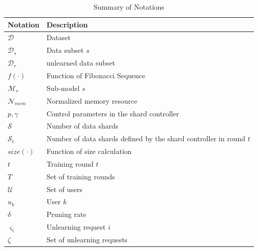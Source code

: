 \documentclass[conference,compsoc]{IEEEtran}
\begin{document}
\begin{table}[ht]
\vspace{-0.5 em}
\small
\renewcommand{\arraystretch}{1.}
\caption{{Summary of Notations}}

\label{tab:notations}
\centering
\begin{tabular}{p{1.8cm}p{5.4cm}}
\toprule

\textbf{Notation} & \textbf{Description}\\
\midrule


$\mathcal{D}$ & Dataset\\

$\mathcal{D}_s$ & Data subset $s$\\

$\mathcal{D}_r$ & unlearned data subset\\

$f(\cdot)$ & Function of Fibonacci Sequence\\

$\mathcal{M}_s$ & Sub-model $s$\\

$\mathcal{N}_{mem}$ & Normalized memory resource \\

$p, \gamma$ & Control parameters in the shard controller \\

$\mathcal{S}$ & Number of data shards \\

$\mathcal{S}_t$ & Number of data shards defined by the shard controller in round $t$ \\

$size(\cdot)$ & Function of size calculation\\

$t$ & Training round $t$ \\

$T$ & Set of training rounds \\

$\mathcal{U}$ & Set of users \\

$u_k$ & User $k$ \\

$\delta$ & Pruning rate\\

$\varsigma_i$ & Unlearning request $i$ \\

$\zeta$ & Set of unlearning requests \\

\bottomrule
\end{tabular}
\vspace{-1 em}
\end{table}
\end{document}
